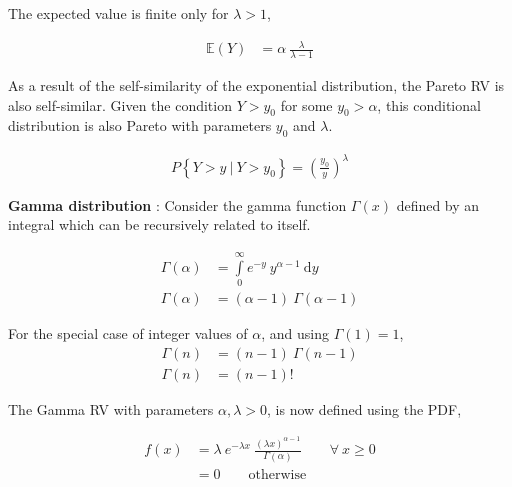 The expected value is finite only for $ \lambda > 1 $,

\begin{align}
	\mathbb{E}(Y) &= \alpha \ \frac{\lambda}{\lambda - 1 }
\end{align}

As a result of the self-similarity of the exponential distribution, the Pareto RV is also self-similar. Given the condition $ Y > y_0 $ for some $ y_0 > \alpha $, this conditional distribution is also Pareto with parameters $ y_0 $ and $ \lambda $.

\begin{align}
	P \left\{Y > y\ |\ Y > y_0 \right\} = \left(\frac{y_0}{y}\right)^\lambda
\end{align}

\textbf{Gamma distribution} : Consider the gamma function $ \Gamma(x) $ defined by an integral which can be recursively related to itself.

\begin{align}
	\Gamma(\alpha) &= \int\limits_{0}^{\infty} e^{-y}\ y^{\alpha -1}\ \mathrm{d}y \\
	\Gamma(\alpha) &= (\alpha - 1)\ \Gamma(\alpha - 1)
\end{align}

For the special case of integer values of $ \alpha $, and using $ \Gamma(1) = 1 $,
\begin{align}
	\Gamma(n) &= (n - 1)\ \Gamma(n - 1) \nonumber \\
	\Gamma(n) &= (n-1)!	
\end{align}

The Gamma RV with parameters $ \alpha, \lambda > 0 $, is now defined using the PDF,

\begin{align}
	f(x) &= \lambda\ e^{- \lambda x}\ \frac{(\lambda x)^{\alpha-1}}{\Gamma(\alpha)} \qquad \forall\ x \geq 0 \\
	&= 0 \qquad \text{otherwise} \nonumber
\end{align}

\begin{figure}[H]
	\centering
\end{figure}



